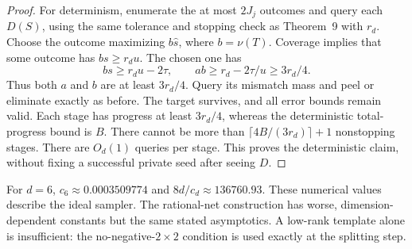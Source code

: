 \begin{proof}
For determinism, enumerate the at most $2J_j$ outcomes and query each $D(S)$, using the same tolerance and stopping check as Theorem~9 with $r_d$. Choose the outcome maximizing $b\widehat s$, where $b=\nu(T)$. Coverage implies that some outcome has $bs\ge r_du$. The chosen one has
\[
 bs\ge r_du-2\tau,\qquad ab\ge r_d-2\tau/u\ge3r_d/4.
\]
Thus both $a$ and $b$ are at least $3r_d/4$. Query its mismatch mass and peel or eliminate exactly as before. The target survives, and all error bounds remain valid. Each stage has progress at least $3r_d/4$, whereas the deterministic total-progress bound is $B$. There cannot be more than $\lceil4B/(3r_d)\rceil+1$ nonstopping stages. There are $O_d(1)$ queries per stage. This proves the deterministic claim, without fixing a successful private seed after seeing $D$.
\end{proof}

For $d=6$, $c_6\approx0.0003509774$ and $8d/c_d\approx136760.93$. These numerical values describe the ideal sampler. The rational-net construction has worse, dimension-dependent constants but the same stated asymptotics. A low-rank template alone is insufficient: the no-negative-$2\times2$ condition is used exactly at the splitting step.
